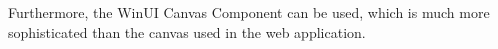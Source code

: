 

Furthermore, the WinUI Canvas Component can be used, which is much more sophisticated than the canvas used in the web application.
